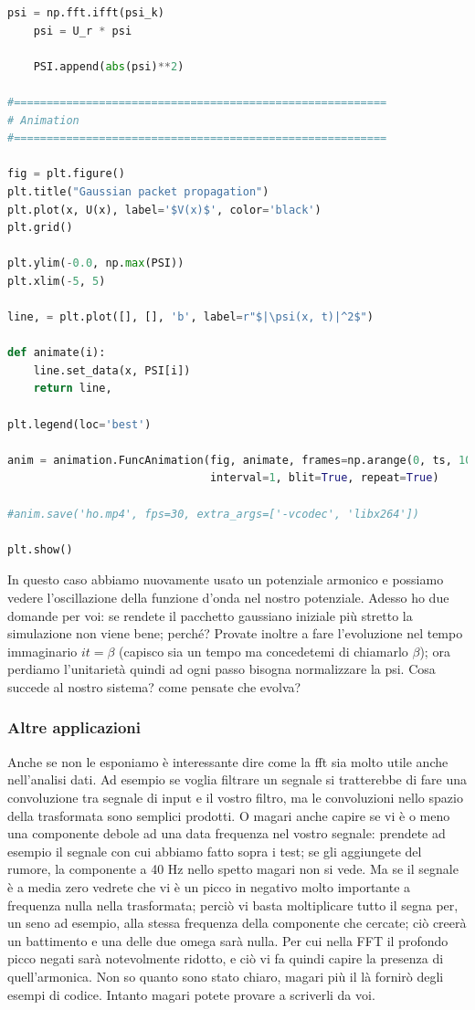 \documentclass[10pt,a4paper]{article}
\begin{document}
\begin{lstlisting}[language=Python]
    psi = np.fft.ifft(psi_k)
    psi = U_r * psi
    
    PSI.append(abs(psi)**2)

#=========================================================
# Animation
#=========================================================

fig = plt.figure()
plt.title("Gaussian packet propagation")
plt.plot(x, U(x), label='$V(x)$', color='black')
plt.grid()

plt.ylim(-0.0, np.max(PSI))
plt.xlim(-5, 5)

line, = plt.plot([], [], 'b', label=r"$|\psi(x, t)|^2$")

def animate(i):
    line.set_data(x, PSI[i])
    return line,

plt.legend(loc='best')

anim = animation.FuncAnimation(fig, animate, frames=np.arange(0, ts, 10), 
                               interval=1, blit=True, repeat=True)

#anim.save('ho.mp4', fps=30, extra_args=['-vcodec', 'libx264'])

plt.show()
\end{lstlisting}
In questo caso abbiamo nuovamente usato un potenziale armonico e possiamo vedere l'oscillazione della funzione d'onda nel nostro potenziale. Adesso ho due domande per voi: se rendete il pacchetto gaussiano iniziale più stretto la simulazione non viene bene; perché? Provate inoltre a fare l'evoluzione nel tempo immaginario $it=\beta$ (capisco sia un tempo ma concedetemi di chiamarlo $\beta$); ora perdiamo l'unitarietà quindi ad ogni passo bisogna normalizzare la psi. Cosa succede al nostro sistema? come pensate che evolva?
\subsubsection{Altre applicazioni}
Anche se non le esponiamo è interessante dire come la fft sia molto utile anche nell'analisi dati. Ad esempio se voglia filtrare un segnale si tratterebbe di fare una convoluzione tra segnale di input e il vostro filtro, ma le convoluzioni nello spazio della trasformata sono semplici prodotti. O magari anche capire se vi è o meno una componente debole ad una data frequenza nel vostro segnale: prendete ad esempio il segnale con cui abbiamo fatto sopra i test; se gli aggiungete del rumore, la componente a 40 Hz nello spetto magari non si vede. Ma se il segnale è a media zero vedrete che vi è un picco in negativo molto importante a frequenza nulla nella trasformata; perciò vi basta moltiplicare tutto il segna per, un seno ad esempio, alla stessa frequenza della componente che cercate; ciò creerà un battimento e una delle due omega sarà nulla. Per cui nella FFT il profondo picco negati sarà notevolmente ridotto, e ciò vi fa quindi capire la presenza di quell'armonica. Non so quanto sono stato chiaro, magari più il là fornirò degli esempi di codice. Intanto magari potete provare a scriverli da voi.
\newpage
\end{document}
